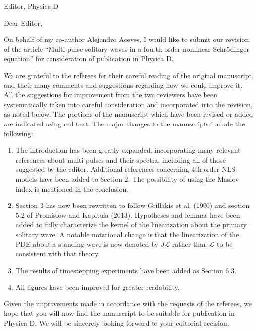 \documentclass[11pt]{letter}
\begin{document}
\address{Ross Parker \\
Department of Mathematics \\
Southern Methodist University \\
Dallas, TX 75275 \\
\texttt{rhparker@smu.edu}}%
\signature{Ross Parker}
\begin{letter}{Editor, Physica D}

\opening{Dear Editor,}

On behalf of my co-author Alejandro Aceves, I would like to submit our revision of the article ``Multi-pulse solitary waves in a fourth-order nonlinear {S}chr{\"o}dinger equation'' for consideration of publication in Physica D. 

We are grateful to the referees for their careful reading of the original manuscript, and their many comments and suggestions regarding how we could improve it. All the suggestions for improvement from the two reviewers have been systematically taken into careful consideration and incorporated into the revision, as noted below. The portions of the manuscript which have been revised or added are indicated using red text. The major changes to the manuscripts include the following:
\begin{enumerate}
	\item The introduction has been greatly expanded, incorporating many relevant references about multi-pulses and their spectra, including all of those suggested by the editor. Additional references concerning 4th order NLS models have been added to Section 2. The possibility of using the Maslov index is mentioned in the conclusion.
	\item Section 3 has now been rewritten to follow Grillakis et al. (1990) and section 5.2 of Promislow and Kapitula (2013). Hypotheses and lemmas have been added to fully characterize the kernel of the linearization about the primary solitary wave. A notable notational change is that the linearization of the PDE about a standing wave is now denoted by $J \mathcal{L}$ rather than $\mathcal{L}$ to be consistent with that theory.  
	\item The results of timestepping experiments have been added as Section 6.3.
	\item All figures have been improved for greater readability.
\end{enumerate}

Given the improvements made in accordance with the requests of the referees, we hope that you will now find the manuscript to be suitable for publication in Physica D. We will be sincerely looking forward to your editorial decision.


\end{letter}
\end{document}
